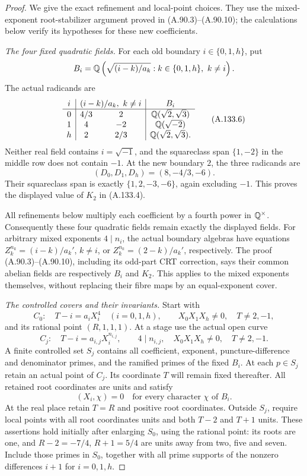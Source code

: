 \begin{proof}
We give the exact refinement and local-point choices.
They use the mixed-exponent root-stabilizer argument
proved in (A.90.3)--(A.90.10); the calculations below
verify its hypotheses for these new coefficients.

\emph{The four fixed quadratic fields.}
For each old boundary \(i\in\{0,1,h\}\), put
\[
 B_i=\mathbb Q\left(\sqrt{(i-k)/a_k}:k\in\{0,1,h\},\ k\ne i\right).
\]
The actual radicands are
\[
\begin{array}{c|cc|c}
 i&\multicolumn{2}{c|}{(i-k)/a_k,\ k\ne i}&B_i\\ \hline
 0&4/3&2&\Q(\sqrt2,\sqrt3)\\
 1&4&-2&\Q(\sqrt{-2})\\
 h&2&2/3&\Q(\sqrt2,\sqrt3).
\end{array}
\tag{A.133.6}
\]
Neither real field contains \(i=\sqrt{-1}\), and the
squareclass span \(\{1,-2\}\) in the middle row does
not contain \(-1\).
At the new boundary \(2\), the three radicands are
\[
           (D_0,D_1,D_h)=(8,-4/3,-6).
\tag{A.133.7}
\]
Their squareclass span is exactly
\(\{1,2,-3,-6\}\), again excluding \(-1\).
This proves the displayed value of \(K_2\) in
(A.133.4).

All refinements below multiply each coefficient by
a fourth power in \(\mathbb Q^\times\).
Consequently these four quadratic fields remain
exactly the displayed fields.
For arbitrary mixed exponents \(4\mid n_i\), the
actual boundary algebras have equations
\(Z_k^{n_k}=(i-k)/a_k'\), \(k\ne i\), or
\(Z_k^{n_k}=(2-k)/a_k'\), respectively.
The proof (A.90.3)--(A.90.10), including its odd-part
CRT correction, says their common abelian fields
are respectively \(B_i\) and \(K_2\).
This applies to the mixed exponents themselves,
without replacing their fibre maps by an equal-exponent
cover.

\emph{The controlled covers and their invariants.}
Start with
\[
 C_0:\quad T-i=a_iX_i^4\quad(i=0,1,h),\qquad
                      X_0X_1X_h\ne0,\quad T\ne2,-1,
\tag{A.133.8}
\]
and its rational point \((R,1,1,1)\).
At a stage use the actual open curve
\[
 C_j:\quad T-i=a_{i,j}X_i^{n_{i,j}},
       \qquad 4\mid n_{i,j},\quad
                X_0X_1X_h\ne0,\quad T\ne2,-1.
\tag{A.133.9}
\]
A finite controlled set \(S_j\) contains all
coefficient, exponent, puncture-difference and
denominator primes, and the ramified primes of
the fixed \(B_i\).
At each \(p\in S_j\) retain an actual point of \(C_j\).
Its coordinate \(T\) will remain fixed thereafter.
All retained root coordinates are units and satisfy
\[
                  (X_i,\chi)=0
       \quad\text{for every character \(\chi\) of \(B_i\)}.
\tag{A.133.10}
\]
At the real place retain \(T=R\) and positive root
coordinates.
Outside \(S_j\), require local points with all root
coordinates units and both \(T-2\) and \(T+1\) units.
These assertions hold initially after enlarging
\(S_0\), using the rational point: its roots are one,
and \(R-2=-7/4\), \(R+1=5/4\) are units away
from two, five and seven.
Include those primes in \(S_0\), together with all
prime supports of the nonzero differences \(i+1\)
for \(i=0,1,h\).


\end{proof}
